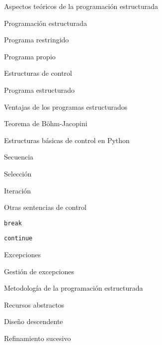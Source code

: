 \begin{longenum}
    \begin{longenum}
        \item Aspectos teóricos de la programación estructurada
        \begin{longenum}
            \item Programación estructurada
            \item Programa restringido
            \item Programa propio
            \item Estructuras de control
            \item Programa estructurado
            \begin{longenum}
                \item Ventajas de los programas estructurados
            \end{longenum}
            \item Teorema de Böhm-Jacopini
        \end{longenum}
        \item Estructuras básicas de control en Python
        \begin{longenum}
            \item Secuencia
            \item Selección
            \item Iteración
            \item Otras sentencias de control
            \begin{longenum}
                \item \texttt{break}
                \item \texttt{continue}
                \item Excepciones
                \begin{longenum}
                    \item Gestión de excepciones
                \end{longenum}
            \end{longenum}
        \end{longenum}
        \item Metodología de la programación estructurada
        \begin{longenum}
            \item Recursos abstractos
            \item Diseño descendente
            \item Refinamiento sucesivo
        \end{longenum}
    \end{longenum}

\end{longenum}
